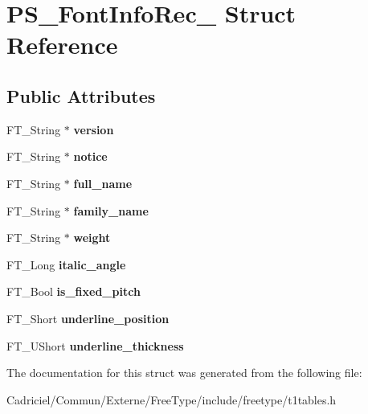 \hypertarget{struct_p_s___font_info_rec__}{\section{P\-S\-\_\-\-Font\-Info\-Rec\-\_\- Struct Reference}
\label{struct_p_s___font_info_rec__}
}
\subsection*{Public Attributes}
\begin{DoxyCompactItemize}
\item 
\hypertarget{struct_p_s___font_info_rec___adb595076e50f8e7ece9446f612433cfc}{F\-T\-\_\-\-String $\ast$ {\bfseries version}}\label{struct_p_s___font_info_rec___adb595076e50f8e7ece9446f612433cfc}

\item 
\hypertarget{struct_p_s___font_info_rec___a63858ebce653f21d9aa2ddc61ee32b80}{F\-T\-\_\-\-String $\ast$ {\bfseries notice}}\label{struct_p_s___font_info_rec___a63858ebce653f21d9aa2ddc61ee32b80}

\item 
\hypertarget{struct_p_s___font_info_rec___a039dbf76ccc1b63b03e77215cb4b430b}{F\-T\-\_\-\-String $\ast$ {\bfseries full\-\_\-name}}\label{struct_p_s___font_info_rec___a039dbf76ccc1b63b03e77215cb4b430b}

\item 
\hypertarget{struct_p_s___font_info_rec___ac54d883f153a495f9a20dc043ed434cf}{F\-T\-\_\-\-String $\ast$ {\bfseries family\-\_\-name}}\label{struct_p_s___font_info_rec___ac54d883f153a495f9a20dc043ed434cf}

\item 
\hypertarget{struct_p_s___font_info_rec___a057243ec7cf62f573fa675ccb728f4b1}{F\-T\-\_\-\-String $\ast$ {\bfseries weight}}\label{struct_p_s___font_info_rec___a057243ec7cf62f573fa675ccb728f4b1}

\item 
\hypertarget{struct_p_s___font_info_rec___ab558a75a56fadd54dfc71dcbeec1375a}{F\-T\-\_\-\-Long {\bfseries italic\-\_\-angle}}\label{struct_p_s___font_info_rec___ab558a75a56fadd54dfc71dcbeec1375a}

\item 
\hypertarget{struct_p_s___font_info_rec___a68e2d0913fe910ea86d558a4a426412a}{F\-T\-\_\-\-Bool {\bfseries is\-\_\-fixed\-\_\-pitch}}\label{struct_p_s___font_info_rec___a68e2d0913fe910ea86d558a4a426412a}

\item 
\hypertarget{struct_p_s___font_info_rec___a772af52d17288d7846e8893e74d55212}{F\-T\-\_\-\-Short {\bfseries underline\-\_\-position}}\label{struct_p_s___font_info_rec___a772af52d17288d7846e8893e74d55212}

\item 
\hypertarget{struct_p_s___font_info_rec___a423904e811db5195485557bf0dccf126}{F\-T\-\_\-\-U\-Short {\bfseries underline\-\_\-thickness}}\label{struct_p_s___font_info_rec___a423904e811db5195485557bf0dccf126}

\end{DoxyCompactItemize}


The documentation for this struct was generated from the following file\-:\begin{DoxyCompactItemize}
\item 
Cadriciel/\-Commun/\-Externe/\-Free\-Type/include/freetype/t1tables.\-h\end{DoxyCompactItemize}
